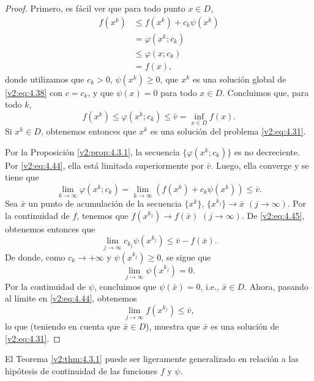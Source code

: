 \begin{proof}
    Primero, es fácil ver que para todo punto $x \in D$,
    \begin{align*}
        f(x^k) &\le f(x^k) + c_k\psi(x^k) \\
        &= \varphi(x^k; c_k) \\
        &\le \varphi(x; c_k) \\
        &= f(x),
    \end{align*}
    donde utilizamos que $c_k > 0$, $\psi(x^k) \ge 0$, que $x^k$ es una solución global de \eqref{v2:eq:4.38} con $c = c_k$, y que $\psi(x) = 0$ para todo $x \in D$. Concluimos que, para todo $k$,
    \begin{equation}
        f(x^k) \le \varphi(x^k; c_k) \le \bar{v} = \inf_{x \in D} f(x).
        \label{v2:eq:4.44}
    \end{equation}
    Si $x^k \in D$, obtenemos entonces que $x^k$ es una solución del problema \eqref{v2:eq:4.31}.
    
    Por la Proposición \ref{v2:prop:4.3.1}, la secuencia $\{\varphi(x^k; c_k)\}$ es no decreciente. Por \eqref{v2:eq:4.44}, ella está limitada superiormente por $\bar{v}$. Luego, ella converge y se tiene que
    \begin{equation}
        \lim_{k \to \infty} \varphi(x^k; c_k) = \lim_{k \to \infty} (f(x^k) + c_k\psi(x^k)) \le \bar{v}.
        \label{v2:eq:4.45}
    \end{equation}
    Sea $\bar{x}$ un punto de acumulación de la secuencia $\{x^k\}$, $\{x^{k_j}\} \to \bar{x}$ $(j \to \infty)$. Por la continuidad de $f$, tenemos que $f(x^{k_j}) \to f(\bar{x})$ $(j \to \infty)$. De \eqref{v2:eq:4.45}, obtenemos entonces que
    \[
        \lim_{j \to \infty} c_{k_j}\psi(x^{k_j}) \le \bar{v} - f(\bar{x}).
    \]
    De donde, como $c_k \to +\infty$ y $\psi(x^{k_j}) \ge 0$, se sigue que
    \[
        \lim_{j \to \infty} \psi(x^{k_j}) = 0.
    \]
    Por la continuidad de $\psi$, concluimos que $\psi(\bar{x}) = 0$, i.e., $\bar{x} \in D$.
    Ahora, pasando al límite en \eqref{v2:eq:4.44}, obtenemos
    \[
        \lim_{j \to \infty} f(x^{k_j}) \le \bar{v},
    \]
    lo que (teniendo en cuenta que $\bar{x} \in D$), muestra que $\bar{x}$ es una solución de \eqref{v2:eq:4.31}.
\end{proof}

El Teorema \ref{v2:thm:4.3.1} puede ser ligeramente generalizado en relación a las hipótesis de continuidad de las funciones $f$ y $\psi$.


